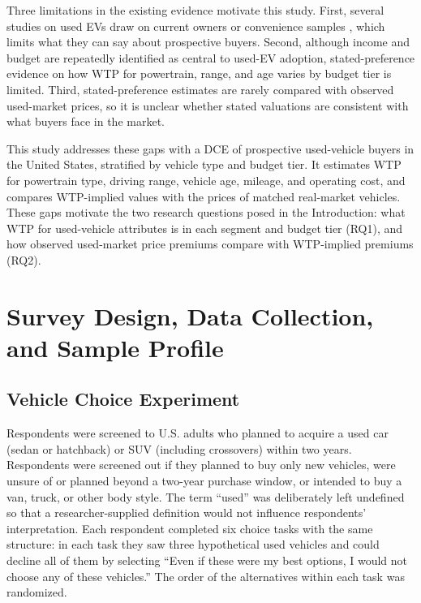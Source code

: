 \documentclass[a4paper,fleqn]{cas-sc}   %
\begin{document}
Three limitations in the existing evidence motivate this study. First, several studies on used EVs draw on current owners or convenience samples \parencite{trd2024usedEV_concerns, sheykhfardAnalyzingPurchaseIntentions2025}, which limits what they can say about prospective buyers. Second, although income and budget are repeatedly identified as central to used-EV adoption, stated-preference evidence on how WTP for powertrain, range, and age varies by budget tier is limited. Third, stated-preference estimates are rarely compared with observed used-market prices, so it is unclear whether stated valuations are consistent with what buyers face in the market.

This study addresses these gaps with a DCE of prospective used-vehicle buyers in the United States, stratified by vehicle type and budget tier. It estimates WTP for powertrain type, driving range, vehicle age, mileage, and operating cost, and compares WTP-implied values with the prices of matched real-market vehicles. These gaps motivate the two research questions posed in the Introduction: what WTP for used-vehicle attributes is in each segment and budget tier (RQ1), and how observed used-market price premiums compare with WTP-implied premiums (RQ2).


\section{Survey Design, Data Collection, and Sample Profile}
\label{section:survey}

\subsection{Vehicle Choice Experiment}
\label{subsec:dce_design}

Respondents were screened to U.S. adults who planned to acquire a used car (sedan or hatchback) or SUV (including crossovers) within two years. Respondents were screened out if they planned to buy only new vehicles, were unsure of or planned beyond a two-year purchase window, or intended to buy a van, truck, or other body style. The term ``used'' was deliberately left undefined so that a researcher-supplied definition would not influence respondents' interpretation. Each respondent completed six choice tasks with the same structure: in each task they saw three hypothetical used vehicles and could decline all of them by selecting ``Even if these were my best options, I would not choose any of these vehicles.'' The order of the alternatives within each task was randomized.
\end{document}
